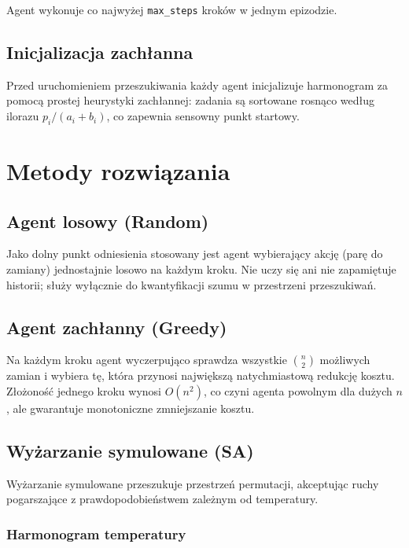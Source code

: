 \documentclass[11pt,a4paper]{article}
\begin{document}
Agent wykonuje co najwyżej \texttt{max\_steps} kroków w jednym epizodzie.

\subsection{Inicjalizacja zachłanna}

Przed uruchomieniem przeszukiwania każdy agent inicjalizuje harmonogram
za pomocą prostej heurystyki zachłannej: zadania są sortowane rosnąco według
ilorazu $p_i / (a_i + b_i)$, co zapewnia sensowny punkt startowy.

\section{Metody rozwiązania}

\subsection{Agent losowy (Random)}

Jako dolny punkt odniesienia stosowany jest agent wybierający akcję
(parę do zamiany) jednostajnie losowo na każdym kroku.
Nie uczy się ani nie zapamiętuje historii; służy wyłącznie do
kwantyfikacji szumu w przestrzeni przeszukiwań.

\subsection{Agent zachłanny (Greedy)}

Na każdym kroku agent wyczerpująco sprawdza wszystkie $\binom{n}{2}$
możliwych zamian i wybiera tę, która przynosi największą natychmiastową
redukcję kosztu.
Złożoność jednego kroku wynosi $O(n^2)$, co czyni agenta powolnym dla
dużych $n$, ale gwarantuje monotoniczne zmniejszanie kosztu.

\subsection{Wyżarzanie symulowane (SA)}

Wyżarzanie symulowane przeszukuje przestrzeń
permutacji, akceptując ruchy pogarszające z prawdopodobieństwem zależnym
od temperatury.

\subsubsection*{Harmonogram temperatury}
\end{document}

